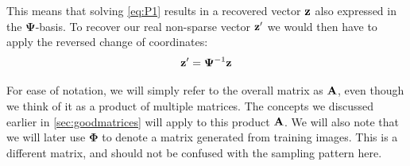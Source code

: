 This means that solving \eqref{eq:P1} results in a recovered vector $ \mathbf{z} $ also expressed in the $ \mathbf{\Psi} $-basis. To recover our real non-sparse vector $ \mathbf{z}' $ we would then have to apply the reversed change of coordinates:
\[
	\mathbf{z}' = \mathbf{\Psi}^{-1}\mathbf{z} 
\]


For ease of notation, we will simply refer to the overall matrix as $ \mathbf{A} $, even though we think of it as a product of multiple matrices. The concepts we discussed earlier in \cref{sec:goodmatrices} will apply to this product $ \mathbf{A} $. We will also note that we will later use $ \mathbf{\Phi} $ to denote a matrix generated from training images. This is a different matrix, and should not be confused with the sampling pattern here. 





